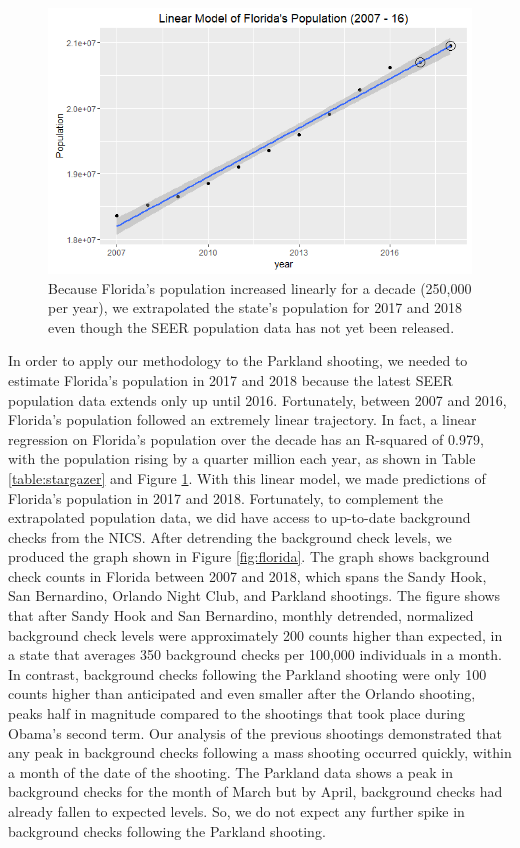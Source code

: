 \documentclass[9pt,twocolumn,twoside,lineno]{pnas-new}
\begin{document}
\begin{figure}
  \centering
  \includegraphics[width=\linewidth]{figures/florida-pop}
  \caption{Because Florida's population increased linearly for a decade (250,000 per year), we extrapolated the state's population for 2017 and 2018 even though the SEER population data has not yet been released.}
  \label{fig:florida-pop}
\end{figure}
	In order to apply our methodology to the Parkland shooting, we needed to estimate Florida’s population in 2017 and 2018 because the latest SEER population data extends only up until 2016. Fortunately, between 2007 and 2016, Florida’s population followed an extremely linear trajectory. In fact, a linear regression on Florida’s population over the decade has an R-squared of 0.979, with the population rising by a quarter million each year, as shown in Table \ref{table:stargazer} and Figure \ref{fig:florida-pop}. With this linear model, we made predictions of Florida’s population in 2017 and 2018. Fortunately, to complement the extrapolated population data, we did have access to up-to-date background checks from the NICS. 
	After detrending the background check levels, we produced the graph shown in Figure \ref{fig:florida}. The graph shows background check counts in Florida between 2007 and 2018, which spans the Sandy Hook, San Bernardino, Orlando Night Club, and Parkland shootings. The figure shows that after Sandy Hook and San Bernardino, monthly detrended, normalized background check levels were approximately 200 counts higher than expected, in a state that averages 350 background checks per 100,000 individuals in a month. In contrast, background checks following the Parkland shooting were only 100 counts higher than anticipated and even smaller after the Orlando shooting, peaks half in magnitude compared to the shootings that took place during Obama’s second term. Our analysis of the previous shootings demonstrated that any peak in background checks following a mass shooting occurred quickly, within a month of the date of the shooting. The Parkland data shows a peak in background checks for the month of March but by April, background checks had already fallen to expected levels. So, we do not expect any further spike in background checks following the Parkland shooting. 
\end{document}
